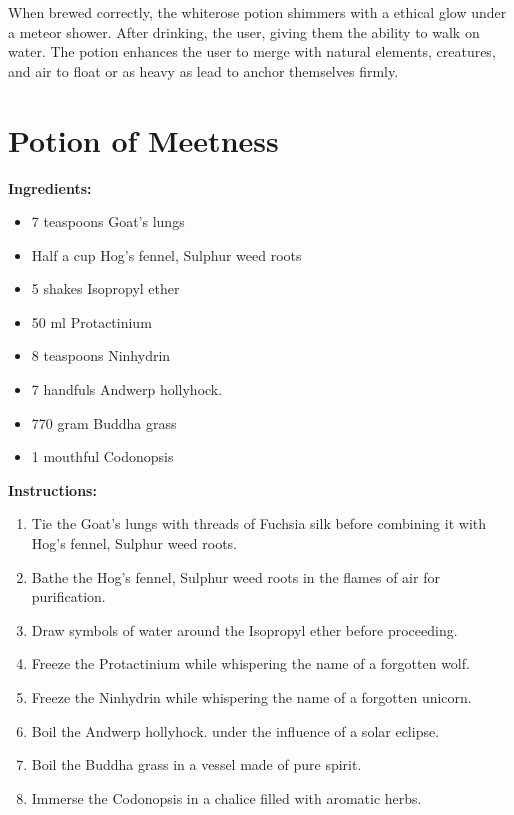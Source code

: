 \documentclass{article}
\begin{document}
When brewed correctly, the whiterose potion shimmers with a ethical glow under a meteor shower. After drinking, the user, giving them the ability to walk on water. The potion enhances the user to merge with natural elements, creatures, and air to float or as heavy as lead to anchor themselves firmly.

\newpage
\section*{Potion of Meetness}

\textbf{Ingredients:}

\begin{itemize}
  \item 7 teaspoons Goat's lungs
  \item Half a cup Hog's fennel, Sulphur weed roots
  \item 5 shakes Isopropyl ether
  \item 50 ml Protactinium
  \item 8 teaspoons Ninhydrin
  \item 7 handfuls Andwerp hollyhock.
  \item 770 gram Buddha grass
  \item 1 mouthful Codonopsis
\end{itemize}

\textbf{Instructions:}

\begin{enumerate}
  \item Tie the Goat's lungs with threads of Fuchsia silk before combining it with Hog's fennel, Sulphur weed roots.
  \item Bathe the Hog's fennel, Sulphur weed roots in the flames of air for purification.
  \item Draw symbols of water around the Isopropyl ether before proceeding.
  \item Freeze the Protactinium while whispering the name of a forgotten wolf.
  \item Freeze the Ninhydrin while whispering the name of a forgotten unicorn.
  \item Boil the Andwerp hollyhock. under the influence of a solar eclipse.
  \item Boil the Buddha grass in a vessel made of pure spirit.
  \item Immerse the Codonopsis in a chalice filled with aromatic herbs.
\end{enumerate}
\end{document}
